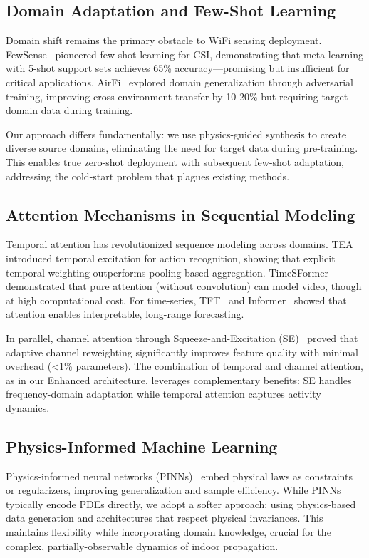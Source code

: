 \documentclass[journal]{IEEEtran}
\begin{document}
\subsection{Domain Adaptation and Few-Shot Learning}
Domain shift remains the primary obstacle to WiFi sensing deployment. FewSense~\cite{fewsense2022} pioneered few-shot learning for CSI, demonstrating that meta-learning with 5-shot support sets achieves 65\% accuracy—promising but insufficient for critical applications. AirFi~\cite{airfi2022} explored domain generalization through adversarial training, improving cross-environment transfer by 10-20\% but requiring target domain data during training.

Our approach differs fundamentally: we use physics-guided synthesis to create diverse source domains, eliminating the need for target data during pre-training. This enables true zero-shot deployment with subsequent few-shot adaptation, addressing the cold-start problem that plagues existing methods.

\subsection{Attention Mechanisms in Sequential Modeling}
Temporal attention has revolutionized sequence modeling across domains. TEA~\cite{li2020tea} introduced temporal excitation for action recognition, showing that explicit temporal weighting outperforms pooling-based aggregation. TimeSFormer~\cite{bertasius2021timesformer} demonstrated that pure attention (without convolution) can model video, though at high computational cost. For time-series, TFT~\cite{lim2021tft} and Informer~\cite{zhou2021informer} showed that attention enables interpretable, long-range forecasting.

In parallel, channel attention through Squeeze-and-Excitation (SE)~\cite{se_networks2018} proved that adaptive channel reweighting significantly improves feature quality with minimal overhead (<1\% parameters). The combination of temporal and channel attention, as in our Enhanced architecture, leverages complementary benefits: SE handles frequency-domain adaptation while temporal attention captures activity dynamics.

\subsection{Physics-Informed Machine Learning}
Physics-informed neural networks (PINNs)~\cite{raissi2019pinn} embed physical laws as constraints or regularizers, improving generalization and sample efficiency. While PINNs typically encode PDEs directly, we adopt a softer approach: using physics-based data generation and architectures that respect physical invariances. This maintains flexibility while incorporating domain knowledge, crucial for the complex, partially-observable dynamics of indoor propagation.
\end{document}
